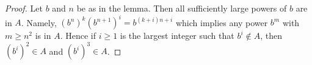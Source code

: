 \documentclass[10pt,a4paper]{amsart}
\theoremstyle{plain}
\theoremstyle{definition}
\theoremstyle{remark}
\numberwithin{equation}{subsection}
\begin{document}
\begin{proof}
Let $b$ and $n$ be as in the lemma.
Then all sufficiently large powers of $b$ are in $A$.
Namely, $(b^n)^k(b^{n + 1})^i = b^{(k + i)n + i}$
which implies any power $b^m$ with $m \geq n^2$ is in $A$.
Hence if $i \geq 1$ is the largest integer such that
$b^i \not \in A$, then $(b^i)^2 \in A$ and $(b^i)^3 \in A$.
\end{proof}
\end{document}
